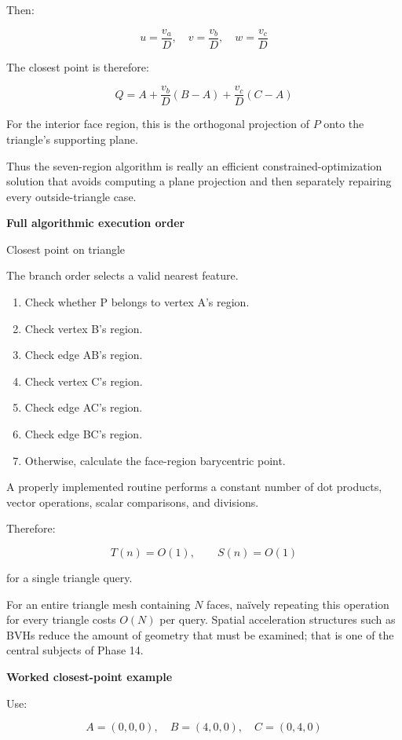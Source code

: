 Then:

\[
u=\frac{v_a}{D},\quad v=\frac{v_b}{D},\quad w=\frac{v_c}{D}
\]

The closest point is therefore:

\[
\boxed{ Q=A+\frac{v_b}{D}(B-A)+\frac{v_c}{D}(C-A) }
\]

For the interior face region, this is the orthogonal projection of \(P\) onto the triangle's supporting plane.

Thus the seven-region algorithm is really an efficient constrained-optimization solution that avoids computing a plane projection and then separately repairing every outside-triangle case.

\textbf{Full algorithmic execution order}

Closest point on triangle

The branch order selects a valid nearest feature.

\begin{enumerate}
\def\labelenumi{\arabic{enumi}.}
\tightlist
\item
  Check whether P belongs to vertex A's region.
\item
  Check vertex B's region.
\item
  Check edge AB's region.
\item
  Check vertex C's region.
\item
  Check edge AC's region.
\item
  Check edge BC's region.
\item
  Otherwise, calculate the face-region barycentric point.
\end{enumerate}

A properly implemented routine performs a constant number of dot products, vector operations, scalar comparisons, and divisions.

Therefore:

\[
T(n)=O(1),\qquad S(n)=O(1)
\]

for a single triangle query.

For an entire triangle mesh containing \(N\) faces, naïvely repeating this operation for every triangle costs \(O(N)\) per query. Spatial acceleration structures such as BVHs reduce the amount of geometry that must be examined; that is one of the central subjects of Phase 14.

\textbf{Worked closest-point example}

Use:

\[
A=(0,0,0),\quad B=(4,0,0),\quad C=(0,4,0)
\]

